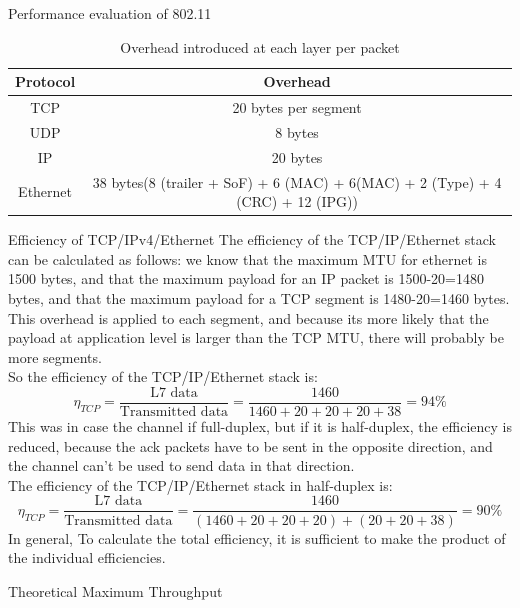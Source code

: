 \begin{section}{Performance evaluation of 802.11}
  
  \begin{table}[h]
    \centering
    \begin{tabular}{|c|c|}
      \hline
      Protocol & Overhead \\
      \hline
      TCP & 20 bytes per segment\\
      \hline
      UDP & 8 bytes\\
      \hline
      IP & 20 bytes\\
      \hline
      Ethernet & 38 bytes(8 (trailer + SoF) + 6 (MAC) + 6(MAC) + 2 (Type) + 4 (CRC) + 12 (IPG))\\
      \hline
    \end{tabular}
    \caption{Overhead introduced at each layer per packet}
  \end{table}
  \begin{subsubsection}{Efficiency of TCP/IPv4/Ethernet}
    The efficiency of the TCP/IP/Ethernet stack can be calculated as follows: we know that the 
    maximum MTU for ethernet is 1500 bytes, and that the maximum payload for an IP packet is 1500-20=1480
    bytes, and that the maximum payload for a TCP segment is 1480-20=1460 bytes.\\
    This overhead is applied to each segment, and because its more likely that the payload at application 
    level is larger than the TCP MTU, there will probably be more segments.\\
    So the efficiency of the TCP/IP/Ethernet stack is:
    \begin{equation}
      \eta_{TCP} = \frac{\text{L7 data}}{\text{Transmitted data}} = \frac{1460}{1460+20+20+20+38} = 94\%
    \end{equation}
    This was in case the channel if full-duplex, but if it is half-duplex, the efficiency is reduced, because
    the ack packets have to be sent in the opposite direction, and the channel can't be used to send data
    in that direction.\\
    The efficiency of the TCP/IP/Ethernet stack in half-duplex is:
    \begin{equation}
      \eta_{TCP} = \frac{\text{L7 data}}{\text{Transmitted data}} = \frac{1460}{(1460+20+20+20)+(20+20+38)} = 90\%
    \end{equation}
    In general, To calculate the total efficiency, it is sufficient to make the product of the
    individual efficiencies.
  \end{subsubsection}
  \begin{subsection}{Theoretical Maximum Throughput}

\end{subsection}
\end{section}
